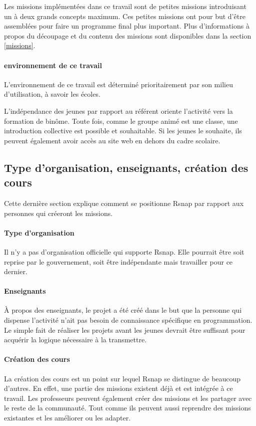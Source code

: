 Les missions implémentées dans ce travail sont de petites missions introduisant un à deux grands concepts maximum. Ces petites missions ont pour but d'être assemblées pour faire un programme final plus important. Plus d'informations à propos du découpage et du contenu des missions sont disponibles dans la section \ref{missions}.

\paragraph{environnement de ce travail}
L'environnement de ce travail est déterminé prioritairement par son milieu d'utilisation, à savoir les écoles. 

L'indépendance des jeunes par rapport au référent oriente l'activité vers la formation de binôme. Toute fois, comme le groupe animé est une classe, une introduction collective est possible et souhaitable. 
Si les jeunes le souhaite, ils peuvent également avoir accès au site web en dehors du cadre scolaire.

\subsection{Type d'organisation, enseignants, création des cours}
Cette dernière section explique comment se positionne Rsnap par rapport aux personnes qui créeront les missions.

\paragraph{Type d'organisation}
Il n'y a pas d'organisation officielle qui supporte Rsnap. Elle pourrait être soit reprise par le gouvernement, soit être indépendante mais travailler pour ce dernier.

\paragraph{Enseignants}
À propos des enseignants, le projet a été créé dans le but que la personne qui dispense l'activité n'ait pas besoin de connaissance spécifique en programmation. Le simple fait de réaliser les projets avant les jeunes devrait être suffisant pour acquérir la logique nécessaire à la transmettre.

\paragraph{Création des cours}
La création des cours est un point sur lequel Rsnap se distingue de beaucoup d'autres. En effet, une partie des missions existent déjà et est intégrée à ce travail. Les professeurs peuvent également créer des missions et les partager avec le reste de la communauté. Tout comme ils peuvent aussi reprendre des missions existantes et les améliorer ou les adapter. %

